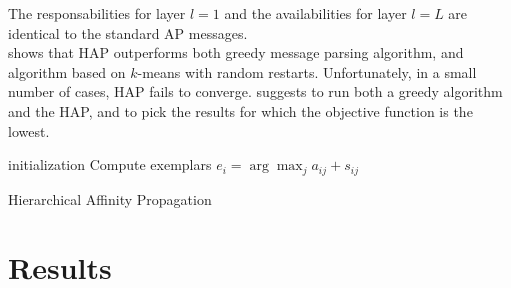 \documentclass{ipol}
\begin{document}
The responsabilities for layer $l = 1$ and the availabilities for layer $l =
L$ are identical to the standard AP messages. \\

\cite{hap} shows that HAP outperforms both greedy message parsing algorithm,
and algorithm based on $k$-means with random restarts. Unfortunately, in a
small number of cases, HAP fails to converge. \cite{hap} suggests to run both
a greedy algorithm and the HAP, and to pick the results for which the
objective function is the lowest.

\begin{algorithm}[h]
  \SetLine
  initialization\;
  Compute exemplars $e_i = \arg \max_{j} a_{ij} + s_{ij}$ \;
  \caption{Hierarchical Affinity Propagation}
\end{algorithm}

\section{Results}


\end{document}
